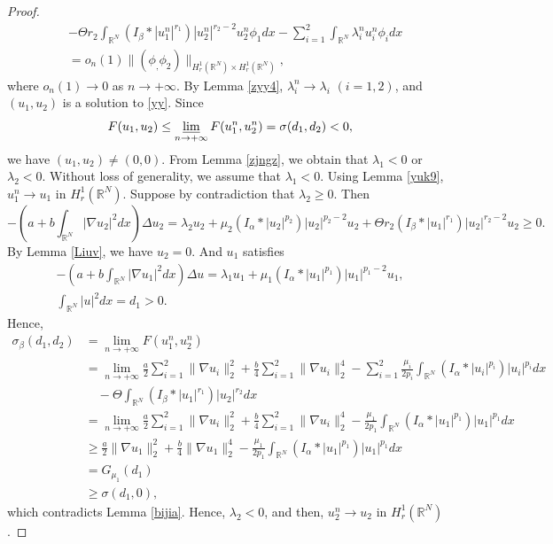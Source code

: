 \documentclass[reqno]{amsart}
\begin{document}
\begin{proof}
\begin{align*}
&-\Theta r_2\int_{\mathbb{R}^N}(I_\beta\ast|u_1^n|^{r_1})|u_2^n|^{r_2-2}u_2^n\phi_1dx-\sum_{i=1}^2\int_{\mathbb{R}^N}\lambda_i^nu_i^n\phi_idx\\
&= o_n(1)\| (\phi_,\phi_2)\|_{H_r^1(\mathbb{R}^N)\times H_r^1(\mathbb{R}^N)},
\end{align*}
where $o_n(1)\to 0$ as $n\to +\infty$. By Lemma \ref{zyy4}, $\lambda_i^n\to \lambda_i$
 $(i=1,2)$, and $(u_1,u_2)$ is a solution to \eqref{yy}.
Since
\begin{equation}\label{ddk3}
F(u_1,u_2)\leq\varliminf_{n\to +\infty}F(u_1^n,u_2^n)=\sigma(d_1,d_2)<0,
\end{equation}
we have $(u_1,u_2)\neq(0,0)$. From Lemma \ref{zjngz}, we obtain
that $\lambda_1<0$ or $\lambda_2<0$. Without loss of generality, we assume that 
$\lambda_1<0$. Using Lemma \ref{yuk9}, $u_1^n\to  u_1$ in $H_r^1(\mathbb{R}^N)$.
Suppose by contradiction that $\lambda_2\geq0$. Then
\[
 -(a+b\int_{\mathbb{R}^N}|\nabla u_2|^2dx)\Delta u_2=\lambda_2 u_2+\mu_2(I_\alpha\ast|u_2|^{p_2})|u_2|^{p_2-2}u_2+
 \Theta r_2(I_\beta\ast|u_1|^{r_1})|u_2|^{r_2-2}u_2\geq0.
\]
By Lemma \ref{Liuv}, we have $u_2=0$. And $u_1$ satisfies
\begin{gather*}
-(a+b\int_{\mathbb{R}^N}|\nabla u_1|^2dx)\Delta u
=\lambda_1 u_1+\mu_1(I_\alpha\ast|u_1|^{p_1})|u_1|^{p_1-2}u_1,\\
\int_{\mathbb{R}^N}|u|^2dx=d_1>0.
 \end{gather*}
Hence,
\begin{align*}
\sigma_{\beta}(d_1,d_2)
&= \lim_{n\to +\infty} F(u_1^n,u_2^n)\\
&= \lim_{n\to +\infty} \frac{a}{2}\sum_{i=1}^2\| \nabla u_i\|_2^2+\frac{b}{4}\sum_{i=1}^2\| \nabla u_i\|_2^4-
\sum_{i=1}^2\frac{\mu_i}{2p_i}\int_{\mathbb{R}^N}(I_\alpha\ast|u_i|^{p_i})|u_i|^{p_i}dx\\
&\quad -\Theta\int_{\mathbb{R}^N}(I_\beta\ast|u_1|^{r_1})|u_2|^{r_2}dx\\
&= \lim_{n\to +\infty} \frac{a}{2}\sum_{i=1}^2\| \nabla u_i\|_2^2+\frac{b}{4}\sum_{i=1}^2\| \nabla u_i\|_2^4
-\frac{\mu_1}{2p_1}\int_{\mathbb{R}^N}(I_\alpha\ast|u_1|^{p_1})|u_1|^{p_1}dx\\
&\geq \frac{a}{2}\| \nabla u_1\|_2^2+\frac{b}{4}\| \nabla u_1\|_2^4-\frac{\mu_1}{2p_1}
\int_{\mathbb{R}^N}(I_\alpha\ast|u_1|^{p_1})|u_1|^{p_1}dx\\
&= G_{\mu_1}(d_1)\\
&\geq  \sigma(d_1,0),
\end{align*}
which  contradicts  Lemma \ref{bijia}. Hence, $\lambda_2<0$, and then,
$u_2^n\to  u_2$ in $H_r^1(\mathbb{R}^N)$.
\end{proof}
\end{document}
